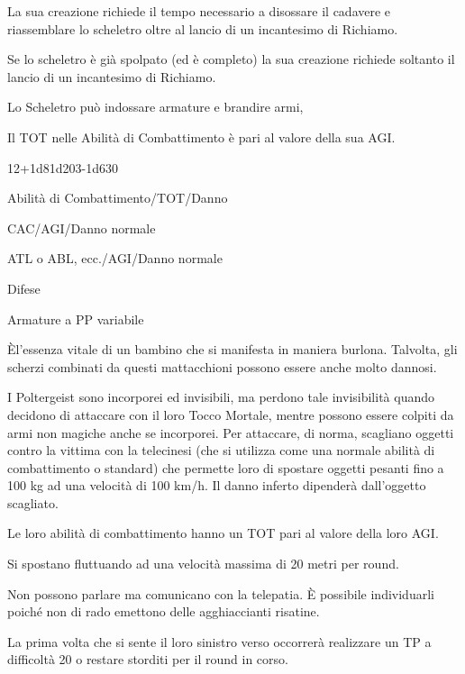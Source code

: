 La sua creazione richiede il tempo necessario a disossare il cadavere
e riassemblare lo scheletro oltre al lancio di un incantesimo di
Richiamo.

Se lo scheletro \`e gi\`a spolpato (ed \`e completo)
la sua creazione richiede soltanto il lancio di un incantesimo di
Richiamo. 

Lo Scheletro pu\`o indossare armature e brandire armi,

Il TOT nelle Abilit\`a di Combattimento \`e pari al valore della sua
AGI.


 {12+1d8}{1d20}{3-1d6}{30}

\begin{parmostro}{Abilit\`a di Combattimento/TOT/Danno}
\item CAC/AGI/Danno normale
\item ATL o ABL, ecc./AGI/Danno normale
\end{parmostro}

\begin{parmostro}{Difese}
\item Armature a PP variabile
\end{parmostro}



\`El'essenza vitale di un bambino che si manifesta in maniera
burlona. Talvolta, gli scherzi combinati da questi mattacchioni
possono essere anche molto dannosi.

I Poltergeist sono incorporei ed invisibili, ma perdono tale
invisibilit\`a quando decidono di attaccare con il loro Tocco
Mortale, mentre possono essere colpiti da armi non magiche anche se
incorporei. Per attaccare, di norma, scagliano oggetti contro la
vittima con la telecinesi (che si utilizza come una normale
abilit\`a di combattimento o standard) che permette loro di spostare
oggetti pesanti fino a 100 kg ad una velocit\`a di 100 km/h. 
Il danno inferto dipender\`a dall'oggetto scagliato. 

Le loro abilit\`a di combattimento hanno un TOT pari al valore della
loro AGI.

Si spostano fluttuando ad una velocit\`a massima di 20 metri per
round.

Non possono parlare ma comunicano con la telepatia. \`E possibile
individuarli poich\'e non di rado emettono delle agghiaccianti risatine.

La prima volta che si sente il loro sinistro verso
occorrer\`a realizzare un TP a difficolt\`a 20 o restare storditi
per il round in corso.

